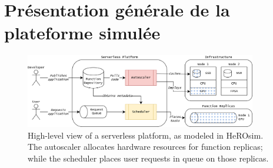 


\section{Présentation générale de la plateforme simulée}
\label{section:herosim-overview}


\begin{figure}[t]
    \centering
    \includegraphics[width=0.9\textwidth]{7_Chapitre5/figures/platform.png}
    \caption{High-level view of a serverless platform, as modeled in HeROsim. The autoscaler allocates hardware resources for function replicas; while the scheduler places user requests in queue on those replicas.}
\label{figure:herosim-platform}
\end{figure}




